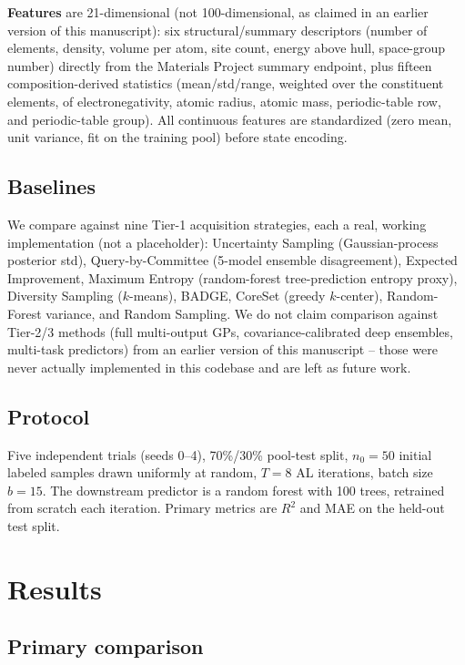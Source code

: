 \documentclass[conference]{IEEEtran}
\begin{document}
\textbf{Features} are 21-dimensional (not 100-dimensional, as claimed in an earlier version of this manuscript): six structural/summary descriptors (number of elements, density, volume per atom, site count, energy above hull, space-group number) directly from the Materials Project summary endpoint, plus fifteen composition-derived statistics (mean/std/range, weighted over the constituent elements, of electronegativity, atomic radius, atomic mass, periodic-table row, and periodic-table group). All continuous features are standardized (zero mean, unit variance, fit on the training pool) before state encoding.

\subsection{Baselines}

We compare against nine Tier-1 acquisition strategies, each a real, working implementation (not a placeholder): Uncertainty Sampling (Gaussian-process posterior std), Query-by-Committee (5-model ensemble disagreement), Expected Improvement, Maximum Entropy (random-forest tree-prediction entropy proxy), Diversity Sampling ($k$-means), BADGE, CoreSet (greedy $k$-center), Random-Forest variance, and Random Sampling. We do not claim comparison against Tier-2/3 methods (full multi-output GPs, covariance-calibrated deep ensembles, multi-task predictors) from an earlier version of this manuscript -- those were never actually implemented in this codebase and are left as future work.

\subsection{Protocol}

Five independent trials (seeds 0--4), 70\%/30\% pool-test split, $n_0=50$ initial labeled samples drawn uniformly at random, $T=8$ AL iterations, batch size $b=15$. The downstream predictor is a random forest with 100 trees, retrained from scratch each iteration. Primary metrics are $R^2$ and MAE on the held-out test split.

\section{Results}\label{sec:results}

\subsection{Primary comparison}
\end{document}
